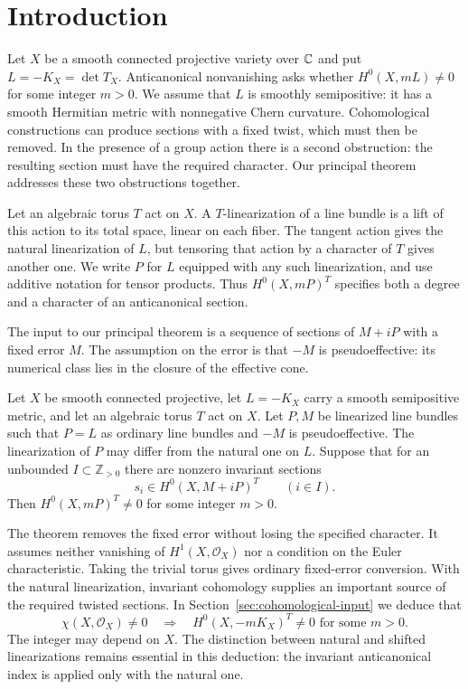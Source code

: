 \section{Introduction}\label{sec:introduction}
Let $X$ be a smooth connected projective variety over $\mathbb C$ and put $L=-K_X=\det T_X$. Anticanonical nonvanishing asks whether $H^0(X,mL)\ne0$ for some integer $m>0$. We assume that $L$ is smoothly semipositive: it has a smooth Hermitian metric with nonnegative Chern curvature. Cohomological constructions can produce sections with a fixed twist, which must then be removed. In the presence of a group action there is a second obstruction: the resulting section must have the required character. Our principal theorem addresses these two obstructions together.

Let an algebraic torus $T$ act on $X$. A $T$-linearization of a line bundle is a lift of this action to its total space, linear on each fiber. The tangent action gives the natural linearization of $L$, but tensoring that action by a character of $T$ gives another one. We write $P$ for $L$ equipped with any such linearization, and use additive notation for tensor products. Thus $H^0(X,mP)^T$ specifies both a degree and a character of an anticanonical section.

The input to our principal theorem is a sequence of sections of $M+iP$ with a fixed error $M$. The assumption on the error is that $-M$ is pseudoeffective: its numerical class lies in the closure of the effective cone.

\begin{theorem}\label{inj:transfer}
Let $X$ be smooth connected projective, let $L=-K_X$ carry a smooth
semipositive metric, and let an algebraic torus $T$ act on $X$.
Let $P,M$ be linearized line bundles such that $P=L$ as ordinary
line bundles and $-M$ is pseudoeffective.  The linearization of $P$
may differ from the natural one on $L$.  Suppose that for an
unbounded $I\subset\mathbb Z_{>0}$ there are nonzero invariant
sections
\[
 s_i\in H^0(X,M+iP)^T\qquad(i\in I).
\]
Then $H^0(X,mP)^T\ne0$ for some integer $m>0$.
\end{theorem}


The theorem removes the fixed error without losing the specified character. It assumes neither vanishing of $H^1(X,\mathcal O_X)$ nor a condition on the Euler characteristic. Taking the trivial torus gives ordinary fixed-error conversion. With the natural linearization, invariant cohomology supplies an important source of the required twisted sections. In Section~\ref{sec:cohomological-input} we deduce that
\[
 \chi(X,\mathcal O_X)\ne0
 \quad\Longrightarrow\quad
 H^0(X,-mK_X)^T\ne0\text{ for some }m>0.
\]
The integer may depend on $X$. The distinction between natural and shifted linearizations remains essential in this deduction: the invariant anticanonical index is applied only with the natural one.

